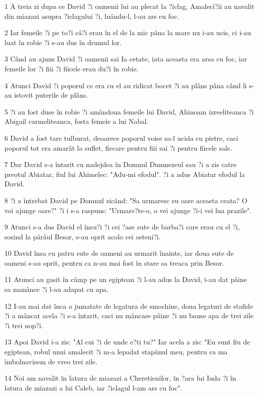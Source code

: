 \par 1 A treia zi dupa ce David ?i oamenii lui au plecat la ?iclag, Amaleci?ii au navalit din miazazi asupra ?iclagului ?i, luându-l, l-au ars cu foc.
\par 2 Iar femeile ?i pe to?i câ?i erau în el de la mic pâna la mare nu i-au ucis, ci i-au luat în robie ?i s-au dus în drumul lor.
\par 3 Când au ajuns David ?i oamenii sai Ia cetate, iata aceasta era arsa cu foc, iar femeile lor ?i fiii ?i fiicele erau du?i în robie.
\par 4 Atunci David ?i poporul ce era cu el au ridicat bocet ?i au plâns pâna când li s-au istovit puterile de plâns.
\par 5 ?i au fost duse în robie ?i amândoua femeile lui David, Ahinoam izreeliteanca ?i Abigail carmeliteanca, fosta femeie a lui Nabal.
\par 6 David a fost tare tulburat, deoarece poporul voise sa-l ucida cu pietre, caci poporul tot era amarât la suflet, fiecare pentru fiii sai ?i pentru fiicele sale.
\par 7 Dar David s-a întarit cu nadejdea în Domnul Dumnezeul sau ?i a zis catre preotul Abiatar, fiul lui Ahimelec: "Adu-mi efodul". ?i a adus Abiatar efodul la David.
\par 8 ?i a întrebat David pe Domnul zicând: "Sa urmaresc eu oare aceasta ceata? O voi ajunge oare?" ?i i s-a raspuns: "Urmare?te-o, o vei ajunge ?i-i vei lua prazile".
\par 9 Atunci s-a dus David el însu?i ?i cei ?ase sute de barba?i care erau cu el ?i, sosind la pârâul Besor, s-au oprit acolo cei osteni?i.
\par 10 David însa cu patru sute de oameni au urmarit înainte, iar doua sute de oameni s-au oprit, pentru ca n-au mai fost în stare sa treaca prin Besor.
\par 11 Atunci au gasit în câmp pe un egiptean ?i l-au adus la David, i-au dat pâine sa manânce ?i l-au adapat cu apa.
\par 12 I-au mai dat înca o jumatate de legatura de smochine, doua legaturi de stafide ?i a mâncat acela ?i s-a întarit, caci nu mâncase pâine ?i nu bause apa de trei zile ?i trei nop?i.
\par 13 Apoi David i-a zis: "Al cui ?i de unde e?ti tu?" Iar acela a zis: "Eu sunt fiu de egiptean, robul unui amalecit ?i m-a lepadat stapânul meu, pentru ca ma îmbolnavisem de vreo trei zile.
\par 14 Noi am navalit în latura de miazazi a Cheretienilor, în ?ara lui Iuda ?i în latura de miazazi a lui Caleb, iar ?iclagul l-am ars cu foc".
